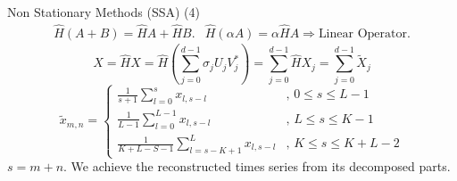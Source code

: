 \documentclass[aspectratio= 169]{beamer}
\begin{document}
			\begin{frame}{Non Stationary Methods (SSA) (4)}
				\begin{equation}
					\begin{array}{lr}
						\hat{H}(A + B) = \hat{H}A + \hat{H}B. & \hat{H}(\alpha A) = \alpha \hat{H}A \Rightarrow \text{Linear Operator.}
					\end{array}
				\end{equation}
				\begin{equation}
					X = \hat{H}X = \hat{H} \left(\sum_{j = 0}^{d - 1} \sigma_j U_j V_j^*\right) = \sum_{j = 0}^{d - 1} \hat{H}X_j = \sum_{j = 0}^{d - 1} \tilde{X}_j
				\end{equation}
				\begin{equation}
					\tilde{x}_{m,n} = 
						\left\{\begin{array}{ll}
							\displaystyle
							\frac{1}{s + 1} \sum_{l = 0}^s x_{l, s - l} & \text{, } 0 \le s \le L - 1\\
							\displaystyle
							\frac{1}{L - 1} \sum_{l = 0}^{L - 1} x_{l, s - l} & \text{, } L \le s \le K - 1\\
							\displaystyle
							\frac{1}{K + L - S - 1} \sum_{l = s - K + 1}^L x_{l, s- l} & \text{, } K \le s \le K + L - 2
						\end{array}\right.
				\end{equation}
				$s = m + n$. We achieve the reconstructed times series from its decomposed parts.
			\end{frame}
			
\end{document}
